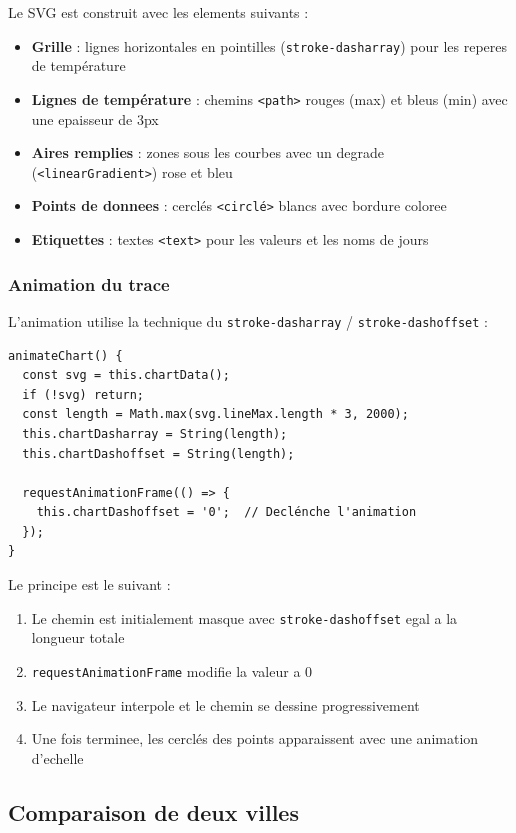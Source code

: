 \documentclass[12pt,a4paper]{article}
\begin{document}
Le SVG est construit avec les elements suivants :
\begin{itemize}[nosep]
    \item \textbf{Grille} : lignes horizontales en pointilles (\texttt{stroke-dasharray}) pour les reperes de température
    \item \textbf{Lignes de température} : chemins \texttt{<path>} rouges (max) et bleus (min) avec une epaisseur de 3px
    \item \textbf{Aires remplies} : zones sous les courbes avec un degrade (\texttt{<linearGradient>}) rose et bleu
    \item \textbf{Points de donnees} : cerclés \texttt{<circlé>} blancs avec bordure coloree
    \item \textbf{Etiquettes} : textes \texttt{<text>} pour les valeurs et les noms de jours
\end{itemize}

\subsubsection{Animation du trace}

L'animation utilise la technique du \texttt{stroke-dasharray} / \texttt{stroke-dashoffset} :

\begin{lstlisting}[style=angular, caption={Animation SVG avec stroke-dasharray}]
animateChart() {
  const svg = this.chartData();
  if (!svg) return;
  const length = Math.max(svg.lineMax.length * 3, 2000);
  this.chartDasharray = String(length);
  this.chartDashoffset = String(length);

  requestAnimationFrame(() => {
    this.chartDashoffset = '0';  // Declénche l'animation
  });
}
\end{lstlisting}

Le principe est le suivant :
\begin{enumerate}[nosep]
    \item Le chemin est initialement masque avec \texttt{stroke-dashoffset} egal a la longueur totale
    \item \texttt{requestAnimationFrame} modifie la valeur a 0
    \item Le navigateur interpole et le chemin \og{}se dessine\fg{} progressivement
    \item Une fois terminee, les cerclés des points apparaissent avec une animation d'echelle
\end{enumerate}

\newpage
\subsection{Comparaison de deux villes}
\end{document}
